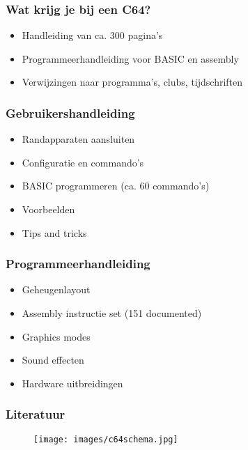 \documentclass[aspectratio=43]{uva-inf-presentation}
\begin{document}

\begin{frame}
\frametitle{Wat krijg je bij een C64?}

\begin{itemize}
\item Handleiding van ca. 300 pagina's
\item Programmeerhandleiding voor BASIC en assembly
\item Verwijzingen naar programma's, clubs, tijdschriften
\end{itemize}

\end{frame}


\begin{frame}
\frametitle{Gebruikershandleiding}

\begin{itemize}
\item Randapparaten aansluiten
\item Configuratie en commando's
\item BASIC programmeren (ca. 60 commando's)
\item Voorbeelden
\item Tips and tricks
\end{itemize}

\end{frame}


\begin{frame}
\frametitle{Programmeerhandleiding}

\begin{itemize}
\item Geheugenlayout
\item Assembly instructie set (151 documented)
\item Graphics modes
\item Sound effecten
\item Hardware uitbreidingen
\end{itemize}

\end{frame}


\begin{frame}
\frametitle{Literatuur}

\begin{figure}
\texttt{[image: images/c64schema.jpg]}
\end{figure}

\end{frame}
\end{document}
